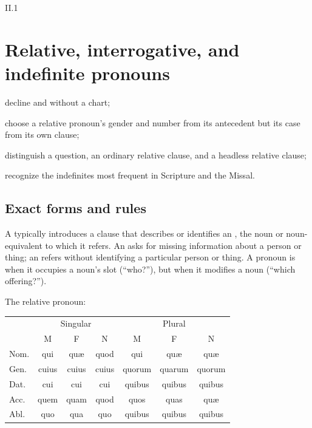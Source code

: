 \begin{courseunit}{II.1}
\chapter{Relative, interrogative, and indefinite pronouns}

\begin{learningobjectives}
  \item decline  and  without a chart;
  \item choose a relative pronoun's gender and number from its antecedent but its case from
        its own clause;
  \item distinguish a question, an ordinary relative clause, and a headless relative clause;
  \item recognize the indefinites most frequent in Scripture and the Missal.
\end{learningobjectives}

\section{Exact forms and rules}

A  typically introduces a clause that describes or identifies an
, the noun or noun-equivalent to which it refers. An
 asks for missing information about a person or
thing; an 
refers without identifying a particular person or thing. A pronoun is
 when it occupies a noun's slot (``who?''), but
 when it modifies a noun (``which offering?'').

\begin{grammarbox}{The relative pronoun: }
\begin{center}
\begin{tabular}{@{}l*{3}{c}@{\qquad}*{3}{c}@{}}
\toprule
& \multicolumn{3}{c}{Singular} & \multicolumn{3}{c}{Plural}\\
& M & F & N & M & F & N\\ \midrule
Nom. & qui & quæ & quod & qui & quæ & quæ\\
Gen. & cuius & cuius & cuius & quorum & quarum & quorum\\
Dat. & cui & cui & cui & quibus & quibus & quibus\\
Acc. & quem & quam & quod & quos & quas & quæ\\
Abl. & quo & qua & quo & quibus & quibus & quibus\\
\bottomrule
\end{tabular}
\end{center}


\end{grammarbox}
\end{courseunit}
